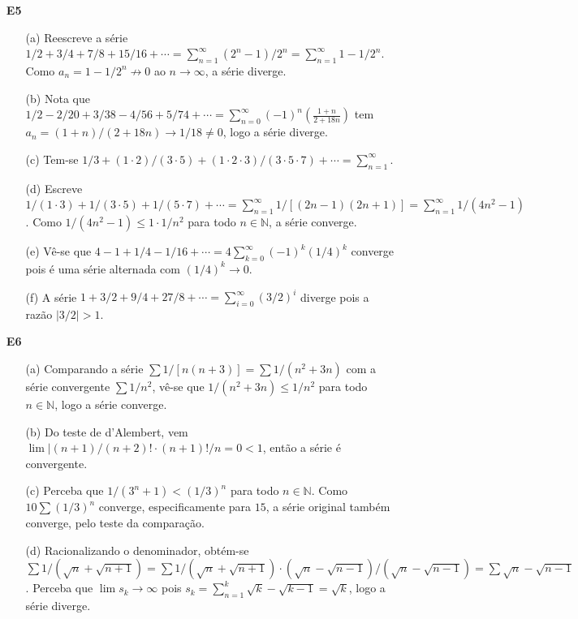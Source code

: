 \documentclass{article}
\begin{document}
\begin{enumerate}
\begin{enumerate}
        \end{enumerate}
    \item [\textbf{E5}]
        \begin{enumerate}
            \item [(a)] Reescreve a série \(1/2 + 3/4 + 7/8 + 15/16 + \cdots = \sum_{n=1}^{\infty} (2^n-1)/2^n = \sum_{n=1}^{\infty} 1-1/2^n\). Como \(a_n = 1-1/2^n \not\to 0\) ao \(n \to \infty\), a série diverge.
            \item [(b)] Nota que \(1/2 - 2/20 + 3/38 - 4/56 + 5/74 + \cdots = \sum_{n=0}^{\infty} (-1)^n \left(\frac{1+n}{2+18n}\right)\) tem \(a_n = (1+n)/(2+18n) \to 1/18 \neq 0\), logo a série diverge.
            \item [(c)] Tem-se \(1/3 + (1\cdot 2)/(3\cdot 5) + (1\cdot 2 \cdot 3)/(3 \cdot 5 \cdot 7) +\cdots = \sum_{n=1}^{\infty}\).
            \item [(d)] Escreve \(1/(1\cdot 3) + 1/(3 \cdot 5) + 1/(5\cdot 7) + \cdots = \sum_{n=1}^{\infty} 1/[(2n-1)(2n+1)] = \sum_{n=1}^{\infty} 1/(4n^2-1)\). Como \(1/(4n^2-1) \leq 1\cdot 1/n^2\) para todo \(n \in \mathbb{N}\), a série converge.
            \item [(e)] Vê-se que \(4-1+1/4-1/16+\cdots = 4\sum_{k=0}^{\infty} (-1)^k(1/4)^k\) converge pois é uma série alternada com \((1/4)^k \to 0\).
            \item [(f)] A série \(1+3/2+9/4+27/8+\cdots = \sum_{i=0}^{\infty} (3/2)^i\) diverge pois a razão \(|3/2| > 1\).
        \end{enumerate}
    \item [\textbf{E6}]
        \begin{enumerate}
            \item [(a)] Comparando a série \(\sum 1/[n(n+3)] = \sum 1/(n^2+3n)\) com a série convergente \(\sum 1/n^2\), vê-se que \(1/(n^2+3n) \leq 1/n^2\) para todo \(n \in \mathbb{N}\), logo a série converge.
            \item [(b)] Do teste de d'Alembert, vem \(\lim \vert (n+1)/(n+2)! \cdot (n+1)!/n = 0 < 1\), então a série é convergente.
            \item [(c)] Perceba que \(1/(3^n+1) < (1/3)^n\) para todo \(n \in \mathbb{N}\). Como \(10\sum (1/3)^n\) converge, especificamente para \(15\), a série original também converge, pelo teste da comparação.
            \item [(d)] Racionalizando o denominador, obtém-se \(\sum 1/(\sqrt{n}+\sqrt{n+1}) = \sum 1/(\sqrt{n}+\sqrt{n+1}) \cdot (\sqrt{n}-\sqrt{n-1})/(\sqrt{n}-\sqrt{n-1}) = \sum \sqrt{n}-\sqrt{n-1}\). Perceba que \(\lim s_k \to \infty\) pois \(s_k = \sum_{n=1}^{k} \sqrt{k}-\sqrt{k-1} = \sqrt{k}\), logo a série diverge.

\end{enumerate}
\end{enumerate}
\end{document}

